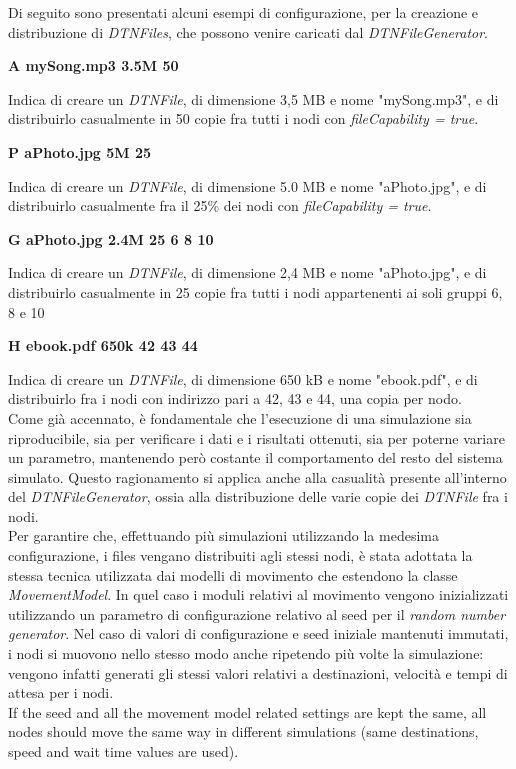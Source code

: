 Di seguito sono presentati alcuni esempi di configurazione, per la creazione e distribuzione di \textit{DTNFiles}, che possono venire caricati dal \textit{DTNFileGenerator}.

\begin{center}
\textbf{A	mySong.mp3	3.5M	50}
\end{center}
Indica di creare un \textit{DTNFile}, di dimensione 3,5 MB e nome "mySong.mp3", e di distribuirlo casualmente in 50 copie fra tutti i nodi con \textit{fileCapability = true}.
\\

\begin{center}
\textbf{P	aPhoto.jpg	5M	25}
\end{center}
Indica di creare un \textit{DTNFile}, di dimensione 5.0 MB e nome "aPhoto.jpg", e di distribuirlo casualmente fra il 25\% dei nodi con \textit{fileCapability = true}.
\\

\begin{center}
\textbf{G	aPhoto.jpg	2.4M	25	6	8	10}
\end{center}
Indica di creare un \textit{DTNFile}, di dimensione 2,4 MB e nome "aPhoto.jpg", e di distribuirlo casualmente in 25 copie fra tutti i nodi appartenenti ai soli gruppi 6, 8 e 10
\\

\begin{center}
\textbf{H	ebook.pdf	650k	42	43	44}
\end{center}
Indica di creare un \textit{DTNFile}, di dimensione 650 kB e nome "ebook.pdf", e di distribuirlo fra i nodi con indirizzo pari a 42, 43 e 44, una copia per nodo.
\\

Come già  accennato, è fondamentale che l'esecuzione di una simulazione sia riproducibile, sia per verificare i dati e i risultati ottenuti, sia per poterne variare un parametro, mantenendo però costante il comportamento del resto del sistema simulato. Questo ragionamento si applica anche alla casualità  presente all'interno del \textit{DTNFileGenerator}, ossia alla distribuzione delle varie copie dei \textit{DTNFile} fra i nodi.
\\
Per garantire che, effettuando più simulazioni utilizzando la medesima configurazione, i files vengano distribuiti agli stessi nodi, è stata adottata la stessa tecnica utilizzata dai modelli di movimento che estendono la classe \textit{MovementModel}. In quel caso i moduli relativi al movimento vengono inizializzati utilizzando un parametro di configurazione relativo al seed per il \textit{random number generator}. Nel caso di valori di configurazione e seed iniziale mantenuti immutati, i nodi si muovono nello stesso modo anche ripetendo più volte la simulazione: vengono infatti generati gli stessi valori relativi a destinazioni, velocità  e tempi di attesa per i nodi.
\\
If the seed and all the movement model related settings are kept the same, all nodes should 
move the same way in different simulations (same destinations, speed and wait time values are used).


